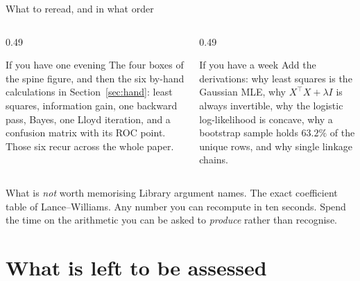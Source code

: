 \documentclass[aspectratio=169]{beamer}
\begin{document}
\begin{frame}[shrink=8]{What to reread, and in what order}
  \begin{columns}[T]
    \begin{column}{0.49\textwidth}
      \begin{block}{If you have one evening}
        The four boxes of the spine figure, and then the six by-hand
        calculations in Section~\ref{sec:hand}: least squares, information
        gain, one backward pass, Bayes, one Lloyd iteration, and a confusion
        matrix with its ROC point. Those six recur across the whole paper.
      \end{block}
    \end{column}
    \begin{column}{0.49\textwidth}
      \begin{block}{If you have a week}
        Add the derivations: why least squares is the Gaussian MLE, why
        $X^\top X + \lambda I$ is always invertible, why the logistic
        log-likelihood is concave, why a bootstrap sample holds $63.2\%$ of
        the unique rows, and why single linkage chains.
      \end{block}
    \end{column}
  \end{columns}
  \begin{alertblock}{What is \emph{not} worth memorising}
    Library argument names. The exact coefficient table of Lance--Williams.
    Any number you can recompute in ten seconds. Spend the time on the
    arithmetic you can be asked to \emph{produce} rather than recognise.
  \end{alertblock}
\end{frame}

\section[Assessment]{What is left to be assessed}
\label{sec:assess}
\end{document}
